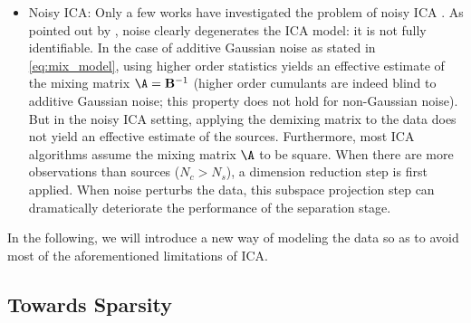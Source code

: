 \begin{itemize}
\item{{Noisy ICA:}} Only a few works have  investigated the problem of noisy ICA  \citep{Davies04,koldo:noise}. As pointed out by  \citet{Davies04}, noise clearly degenerates the ICA model: it is not fully identifiable. In the case of additive Gaussian noise as stated in \eqref{eq:mix_model}, using higher order statistics yields an effective estimate of the mixing matrix $\A = {\bf B}^{-1}$ (higher order cumulants are indeed blind to additive Gaussian noise; this property does not hold for non-Gaussian noise). But in the noisy ICA setting, applying the demixing matrix to the data does not yield an effective estimate of the sources. Furthermore, most ICA algorithms assume the mixing matrix $\A$ to be square. When there are more observations than sources ($N_c > N_s$), a dimension reduction step is first applied. When noise perturbs the data, this subspace projection step can dramatically deteriorate the performance of the separation stage.
\end{itemize}
In the following,  we will introduce a new way of modeling the data so as to avoid most of the aforementioned limitations of ICA.

\subsection{Towards Sparsity}
\label{subsec:towardsparsity}

